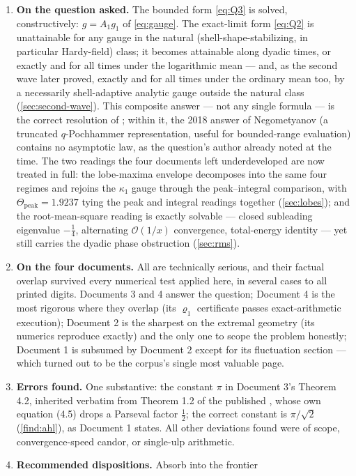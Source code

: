 \documentclass[11pt,oneside]{article}
\theoremstyle{definition}
\theoremstyle{remark}
\newcommand{\bigO}{\mathcal O}
\begin{document}
\begin{enumerate}
\item \textbf{On the question asked.}  The bounded form \eqref{eq:Q3} is
solved, constructively: $g=A_1g_1$ of \eqref{eq:gauge}.  The exact-limit
form \eqref{eq:Q2} is unattainable for any gauge in the natural
(shell-shape-stabilizing, in particular Hardy-field) class; it becomes
attainable along dyadic times, or exactly and for all times under the
logarithmic mean --- and, as the second wave later proved, exactly and
for all times under the ordinary mean too, by a necessarily
shell-adaptive analytic gauge outside the natural class
(\cref{sec:second-wave}).  This composite answer --- not any single formula ---
is the correct resolution of \cite{mse-decay}; within it, the 2018
answer of Negometyanov (a truncated $q$-Pochhammer representation,
useful for bounded-range evaluation) contains no asymptotic law, as the
question's author already noted at the time.  The two readings the four
documents left underdeveloped are now treated in full: the lobe-maxima
envelope decomposes into the same four regimes and rejoins the
$\kappa_1$ gauge through the peak--integral comparison, with
$\Theta_{\mathrm{peak}}=1.9237$ tying the peak and integral readings
together (\cref{sec:lobes}); and the root-mean-square reading is exactly
solvable --- closed subleading eigenvalue $-\tfrac14$, alternating
$\bigO(1/x)$ convergence, total-energy identity --- yet still carries
the dyadic phase obstruction (\cref{sec:rms}).
\item \textbf{On the four documents.}  All are technically serious, and
their factual overlap survived every numerical test applied here, in
several cases to all printed digits.  Documents 3 and 4 answer the
question; Document 4 is the most rigorous where they overlap (its
$\varrho_1$ certificate passes exact-arithmetic execution); Document 2
is the sharpest on the extremal geometry (its numerics reproduce
exactly) and the only one to scope the problem honestly; Document 1 is
subsumed by Document 2 except for its fluctuation section --- which
turned out to be the corpus's single most valuable page.
\item \textbf{Errors found.}  One substantive: the constant $\pi$ in
Document 3's Theorem 4.2, inherited verbatim from Theorem 1.2 of the
published \cite{ahl2017}, whose own equation (4.5) drops a Parseval
factor $\tfrac12$; the correct constant is $\pi/\sqrt2$
(\cref{find:ahl}), as Document 1 states.  All other deviations found
were of scope, convergence-speed candor, or single-ulp arithmetic.
\item \textbf{Recommended dispositions.}  Absorb into the frontier

\end{enumerate}
\end{document}
